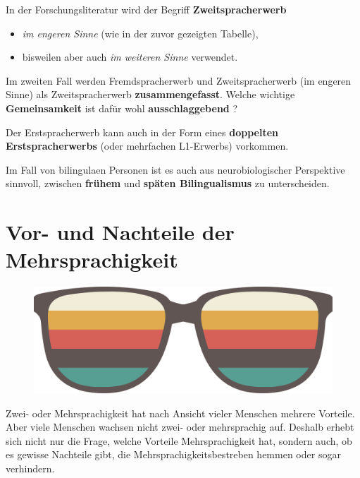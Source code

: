 \documentclass[
  letterpaper,
]{scrbook}
\begin{document}
In der Forschungsliteratur wird der Begriff \textbf{Zweitspracherwerb}

\begin{itemize}
\item
  \emph{im engeren Sinne} (wie in der zuvor gezeigten Tabelle),
\item
  bisweilen aber auch \emph{im weiteren Sinne} verwendet.
\end{itemize}

Im zweiten Fall werden Fremdspracherwerb und Zweitspracherwerb (im
engeren Sinne) als Zweitspracherwerb \textbf{zusammengefasst}. Welche
wichtige \textbf{Gemeinsamkeit} ist dafür wohl \textbf{ausschlaggebend}
?

Der Erstspracherwerb kann auch in der Form eines \textbf{doppelten
Erstspracherwerbs} (oder mehrfachen L1-Erwerbs) vorkommen.

Im Fall von bilingulaen Personen ist es auch aus neurobiologischer
Perspektive sinnvoll, zwischen \textbf{frühem} und \textbf{späten
Bilingualismus} zu unterscheiden.

\hypertarget{sec-bilingual}{%
\chapter{Vor- und Nachteile der Mehrsprachigkeit}\label{sec-bilingual}}

\begin{figure}

{\centering 

\href{https://www.clipartmax.com/middle/m2H7m2i8Z5A0N4Z5_lounge-style-sunglasses-retro-interlude-png-image-high-glasses-clipart-retro/}{\includegraphics[width=1\textwidth,height=\textheight]{./pictures/clipart4776991.png}}

}

\end{figure}

Zwei- oder Mehrsprachigkeit hat nach Ansicht vieler Menschen mehrere
Vorteile. Aber viele Menschen wachsen nicht zwei- oder mehrsprachig auf.
Deshalb erhebt sich nicht nur die Frage, welche Vorteile
Mehrsprachigkeit hat, sondern auch, ob es gewisse Nachteile gibt, die
Mehrsprachigkeitsbestreben hemmen oder sogar verhindern.
\end{document}
